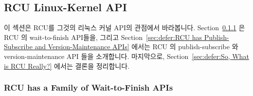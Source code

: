 
\subsection{RCU Linux-Kernel API}
\label{sec:defer:RCU Linux-Kernel API}

이 섹션은 RCU를 그것의 리눅스 커널 API의 관점에서 바라봅니다.
Section~\ref{sec:defer:RCU has a Family of Wait-to-Finish APIs}
은 RCU 의 wait-to-finish API들을, 그리고
Section~\ref{sec:defer:RCU has Publish-Subscribe and Version-Maintenance APIs}
에서는 RCU 의 publish-subscribe 와 version-maintenance API 들을 소개합니다.
마지막으로,
Section~\ref{sec:defer:So, What is RCU Really?}
에서는 결론을 정리합니다.
\iffalse

This section looks at RCU from the viewpoint of its Linux-kernel API.
Section~\ref{sec:defer:RCU has a Family of Wait-to-Finish APIs}
presents RCU's wait-to-finish APIs, and
Section~\ref{sec:defer:RCU has Publish-Subscribe and Version-Maintenance APIs}
presents RCU's publish-subscribe and version-maintenance APIs.
Finally,
Section~\ref{sec:defer:So, What is RCU Really?}
presents concluding remarks.
\fi

\subsubsection{RCU has a Family of Wait-to-Finish APIs}
\label{sec:defer:RCU has a Family of Wait-to-Finish APIs}

